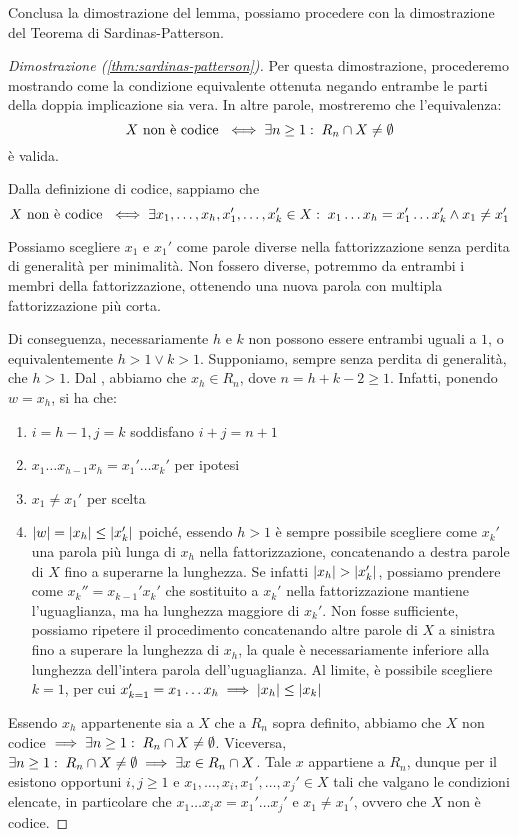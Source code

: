 Conclusa la dimostrazione del lemma, possiamo procedere con la dimostrazione del Teorema di Sardinas-Patterson.
\begin{proof}[Dimostrazione (\ref{thm:sardinas-patterson})]
  Per questa dimostrazione, procederemo mostrando come la condizione equivalente ottenuta negando entrambe le parti della doppia implicazione sia vera.
  In altre parole, mostreremo che l'equivalenza:
  \[X \text{ non è codice } \iff \exists n \geq 1 :\; R_n \cap X \neq \emptyset\]
  è valida.

  Dalla definizione di codice, sappiamo che 
  \[X \text{ non è codice } \iff \exists x_1, \ldots, x_h,x_1',\ldots,x_k' \in X :\; x_1\ldots x_h = x_1'\ldots x_k' \land x_1 \neq x_1'\]
  
  Possiamo scegliere \(x_1\) e \(x_1'\) come parole diverse nella fattorizzazione senza perdita di generalità per minimalità.
  Non fossero diverse, potremmo  da entrambi i membri della fattorizzazione, ottenendo una nuova parola con multipla fattorizzazione più corta.
  
  Di conseguenza, necessariamente \(h\) e \(k\) non possono essere entrambi uguali a \(1\), o equivalentemente \(h>1 \lor k>1\).
  Supponiamo, sempre senza perdita di generalità, che \(h>1\).
  Dal , abbiamo che \(x_h \in R_n\), dove \(n = h + k - 2 \geq 1\).
  Infatti, ponendo \(w = x_h\), si ha che:
  \begin{enumerate}
    \item \(i = h - 1, j = k\) soddisfano \(i + j = n + 1\)
    \item \(x_1\ldots x_{h-1} x_h = x_1'\ldots x_k'\) per ipotesi
    \item \(x_1 \neq x_1'\) per scelta
    \item \(\left|w\right| = \left|x_h\right| \leq \left|x_k'\right|\) poiché, essendo \(h>1\) è sempre possibile scegliere come \(x_k'\) una parola più lunga di \(x_h\) nella fattorizzazione, concatenando a destra parole di \(X\) fino a superarne la lunghezza.
      Se infatti \(\left|x_h\right| > \left|x_k'\right|\), possiamo prendere come \(x_k'' =  x_{k-1}'x_k'\) che sostituito a \(x_k'\) nella fattorizzazione mantiene l'uguaglianza, ma ha lunghezza maggiore di \(x_k'\). Non fosse sufficiente, possiamo ripetere il procedimento concatenando altre parole di \(X\) a sinistra fino a superare la lunghezza di \(x_h\), la quale è necessariamente inferiore alla lunghezza dell'intera parola dell'uguaglianza.
      Al limite, è possibile scegliere \(k=1\), per cui \(x_{k=1}' = x_1\ldots x_h \implies \left|x_h\right|\leq\left|x_k\right| \)
  \end{enumerate}
  Essendo \(x_h\) appartenente sia a \(X\) che a \(R_n\) sopra definito, abbiamo che \(X\) non codice \(\implies \exists n \geq 1 :\; R_n \cap X \neq \emptyset\).
  Viceversa, \(\exists n \geq 1 :\; R_n \cap X \neq \emptyset \implies \exists x \in R_n \cap X\).
  Tale \(x\) appartiene a \(R_n\), dunque per il  esistono opportuni \(i,j \geq 1\) e \(x_1,\ldots,x_i,x_1',\ldots,x_j' \in X\) tali che valgano le condizioni elencate, in particolare che \(x_1\ldots x_i x = x_1'\ldots x_j'\) e \(x_1 \neq x_1'\), ovvero che \(X\) non è codice.
\end{proof}

